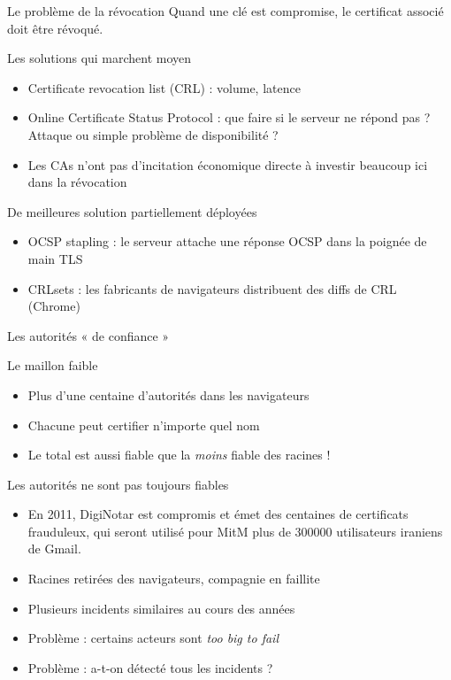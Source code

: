\documentclass{mpg-ep-slides}
\begin{document}
\begin{frame}{Le problème de la révocation}
  Quand une clé est compromise, le certificat associé doit être révoqué.

  \begin{block}{Les solutions qui marchent moyen}
    \begin{itemize}
      \item Certificate revocation list (CRL) : volume, latence
      \item Online Certificate Status Protocol : que faire si le serveur ne
        répond pas ? Attaque ou simple problème de disponibilité ?
      \item Les CAs n'ont pas d'incitation économique directe à investir
        beaucoup ici dans la révocation
    \end{itemize}
  \end{block}

  \begin{block}{De meilleures solution partiellement déployées}
    \begin{itemize}
      \item OCSP stapling : le serveur attache une réponse OCSP dans la
        poignée de main TLS
      \item CRLsets : les fabricants de navigateurs distribuent des diffs de
        CRL (Chrome)
    \end{itemize}
  \end{block}
\end{frame}

\begin{frame}{Les autorités « de confiance »}
  \begin{block}{Le maillon faible}
    \begin{itemize}
      \item Plus d'une centaine d'autorités dans les navigateurs
      \item Chacune peut certifier n'importe quel nom
      \item Le total est aussi fiable que la \emph{moins} fiable des racines !
    \end{itemize}
  \end{block}

  \begin{block}{Les autorités ne sont pas toujours fiables}
    \begin{itemize}
      \item En 2011, DigiNotar est compromis et émet des centaines de
        certificats frauduleux, qui seront utilisé pour MitM plus de 300000
        utilisateurs iraniens de Gmail.
      \item Racines retirées des navigateurs, compagnie en faillite
      \item Plusieurs incidents similaires au cours des années
      \item Problème : certains acteurs sont \emph{too big to fail}
      \item Problème : a-t-on détecté tous les incidents ?
    \end{itemize}
  \end{block}
\end{frame}
\end{document}
